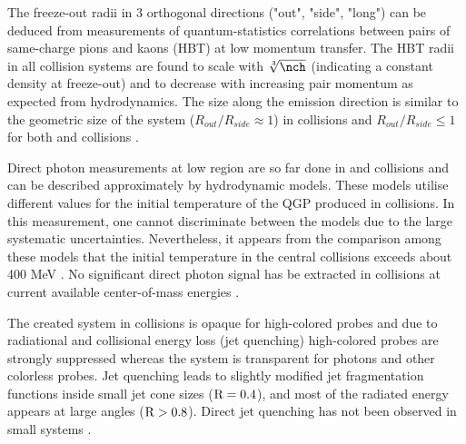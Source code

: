 \documentclass[../report.tex]{subfiles}
\begin{document}
The freeze-out radii in 3 orthogonal directions ("out", "side", "long") can be deduced from measurements of quantum-statistics correlations between pairs of same-charge pions and kaons (HBT) at low momentum transfer. The HBT radii in all collision systems are found to scale with $\sqrt[3]{\nch}$ (indicating a constant density at freeze-out) and to decrease with increasing pair momentum \kT as expected from hydrodynamics. The size along the emission direction is similar to the geometric size of the system ($R_{out}/R_{side} \approx 1$) in \PbPb collisions  \cite{Adam:2015vna,Adam:2015vja,Abelev:2014pja,CMS:2014mla,Acharya:2017qtq,Acharya:2017qtq} and $R_{out}/R_{side} \leq 1$ for both \pPb and \pp collisions \cite{Abelev:2014pja,Adam:2015pya,Aamodt:2011kd,CMS:2014mla,Aaboud:2017xpw}.

Direct photon measurements at low \pT region are so far done in \PbPb and \pp collisions and can be described approximately by hydrodynamic models. These models utilise different values for the initial temperature of the QGP produced in \PbPb collisions. In this measurement, one cannot discriminate between the models due to the large systematic uncertainties. Nevertheless, it appears from the comparison among these models that the initial temperature in the central \PbPb collisions exceeds about 400 MeV \cite{Adam:2015lda}. No significant direct photon signal has be extracted in \pp collisions at current available center-of-mass energies \cite{Acharya:2018dqe}.

The created system in \PbPb collisions is opaque for high-\pT colored probes and due to radiational and collisional energy loss (jet quenching) high-\pT colored probes are strongly suppressed whereas the system is transparent for photons and other colorless probes. Jet quenching leads to slightly modified jet fragmentation functions inside small jet cone sizes ($\rm{R} = 0.4$), and most of the radiated energy appears at large angles ($\rm{R} > 0.8$). Direct jet quenching has not been observed in small systems \cite{Aad:2010bu,Aamodt:2010jd,Chatrchyan:2011sx,CMS:2012aa,Abelev:2012hxa,ALICE:2012ab,Aad:2014bxa,Adam:2015ewa,Aad:2015wga,Adam:2016jfp,Adam:2016xbp,Sirunyan:2017jic,Sirunyan:2016fcs,Sirunyan:2018jqr,Sirunyan:2018jju,Sirunyan:2018qec,Sirunyan:2017qhf,Khachatryan:2016tfj,Sirunyan:2017bsd,Aaboud:2017bzv,Aaboud:2017eww}.
\end{document}
